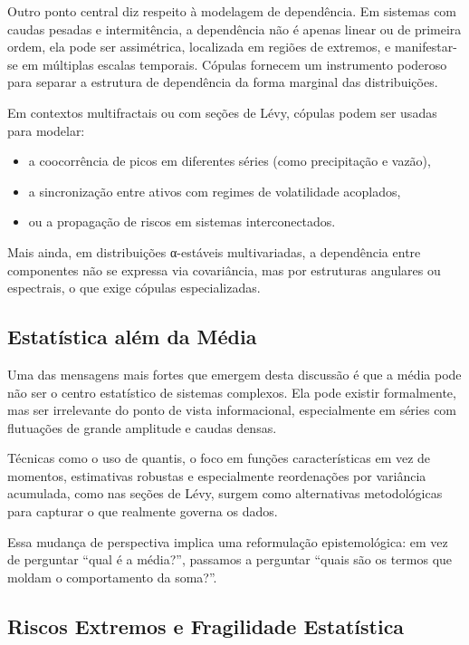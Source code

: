 \documentclass[
  letterpaper,
  DIV=11,
  numbers=noendperiod]{scrartcl}
\providecommand{\tightlist}{%
  \setlength{\itemsep}{0pt}\setlength{\parskip}{0pt}}\usepackage{longtable,booktabs,array}
\begin{document}
Outro ponto central diz respeito à modelagem de dependência. Em sistemas
com caudas pesadas e intermitência, a dependência não é apenas linear ou
de primeira ordem, ela pode ser assimétrica, localizada em regiões de
extremos, e manifestar-se em múltiplas escalas temporais. Cópulas
fornecem um instrumento poderoso para separar a estrutura de dependência
da forma marginal das distribuições.

Em contextos multifractais ou com seções de Lévy, cópulas podem ser
usadas para modelar:

\begin{itemize}
\tightlist
\item
  a coocorrência de picos em diferentes séries (como precipitação e
  vazão),
\item
  a sincronização entre ativos com regimes de volatilidade acoplados,
\item
  ou a propagação de riscos em sistemas interconectados.
\end{itemize}

Mais ainda, em distribuições α-estáveis multivariadas, a dependência
entre componentes não se expressa via covariância, mas por estruturas
angulares ou espectrais, o que exige cópulas especializadas.

\subsection{Estatística além da
Média}\label{estatuxedstica-aluxe9m-da-muxe9dia}

Uma das mensagens mais fortes que emergem desta discussão é que a média
pode não ser o centro estatístico de sistemas complexos. Ela pode
existir formalmente, mas ser irrelevante do ponto de vista
informacional, especialmente em séries com flutuações de grande
amplitude e caudas densas.

Técnicas como o uso de quantis, o foco em funções características em vez
de momentos, estimativas robustas e especialmente reordenações por
variância acumulada, como nas seções de Lévy, surgem como alternativas
metodológicas para capturar o que realmente governa os dados.

Essa mudança de perspectiva implica uma reformulação epistemológica: em
vez de perguntar ``qual é a média?'', passamos a perguntar ``quais são
os termos que moldam o comportamento da soma?''.

\subsection{Riscos Extremos e Fragilidade
Estatística}\label{riscos-extremos-e-fragilidade-estatuxedstica}
\end{document}
